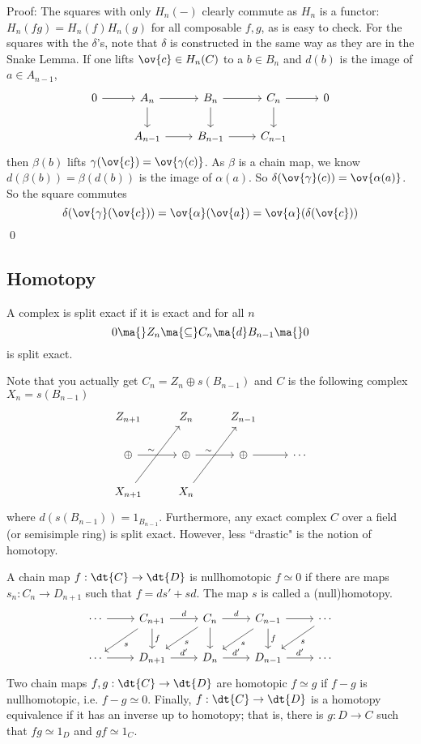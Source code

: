 Proof: The squares with only $H_n(-)$ clearly commute as $H_n$ is a functor: $H_n(fg)=H_n(f) H_n(g)$ for all composable $f,g$, as is easy to check. For the squares with the $\delta$'s, note that $\delta$ is constructed in the same way as they are in the Snake Lemma. If one lifts $\ov{c} \in H_n(C)$ to a $b \in B_n$ and $d(b)$ is the image of $a \in A_{n-1}$,
\[
\begin{tikzcd}
0 \arrow{r} & A_n \arrow{d} \arrow{r} & B_n \arrow{r} \arrow{d} & C_n \arrow{r} \arrow{d} & 0 \\
& A_{n-1} \arrow{r} & B_{n-1} \arrow{r} & C_{n-1} & 
\end{tikzcd}
\]
then $\beta(b)$ lifts $\gamma(\ov{c})=\ov{\gamma(c)}$. As $\beta$ is a chain map, we know $d(\beta(b))=\beta(d(b))$ is the image of $\alpha(a)$. So $\delta(\ov{\gamma}(c))=\ov{\alpha(a)}$. So the square commutes
\[
\delta(\ov{\gamma}(\ov{c}))= \ov{\alpha}(\ov{a})=\ov{\alpha}(\delta(\ov{c}))
\]
\qed \\

\subsection{Homotopy} 

\begin{dfn}
A complex is split exact if it is exact and for all $n$
\[
0 \ma{} Z_n \ma{\subseteq} C_n \ma{d} B_{n-1} \ma{} 0
\]
is split exact. 
\end{dfn}

Note that you actually get $C_n=Z_n \oplus s(B_{n-1})$ and $C$ is the following complex $X_n=s(B_{n-1})$
\[
\begin{tikzcd}
Z_{n+1} & Z_n & Z_{n-1} & \\
\oplus \arrow{r} & \oplus \arrow{r}  & \oplus \arrow{r} & \cdots \\
X_{n+1} \arrow{uur}{\sim} & X_n \arrow{uur}{\sim} & 
\end{tikzcd}
\]
where $d(s(B_{n-1}))=1_{B_{n-1}}$. Furthermore, any exact complex $C$ over a field (or semisimple ring) is split exact. However, less ``drastic" is the notion of homotopy. 

\begin{dfn}[Nulltomotopy]
A chain map $f: \dt{C} \to \dt{D}$ is nullhomotopic $f \simeq 0$ if there are maps $s_n: C_n \to D_{n+1}$ such that $f=ds'+sd$. The map $s$ is called a (null)homotopy. 
\[
\begin{tikzcd}
\cdots \arrow{r} & C_{n+1} \arrow{r}{d} \arrow{d}{f} \arrow{dl}{s} & C_n \arrow{r}{d} \arrow{d} \arrow{dl}{s} & C_{n-1} \arrow{r} \arrow{d}{f} \arrow{dl}{s} & \cdots \arrow{dl}{s} \\
\cdots \arrow{r} & D_{n+1} \arrow{r}{d'} & D_n \arrow{r}{d'} & D_{n-1} \arrow{r}{d'} & \cdots 
\end{tikzcd}
\]
Two chain maps $f,g: \dt{C} \to \dt{D}$ are homotopic $f\simeq g$ if $f-g$ is nullhomotopic, i.e. $f-g \simeq 0$. Finally, $f: \dt{C} \to \dt{D}$ is a homotopy equivalence if it has an inverse up to homotopy; that is, there is $g: D \to C$ such that $fg \simeq 1_D$ and $gf \simeq 1_C$. 
\end{dfn}

